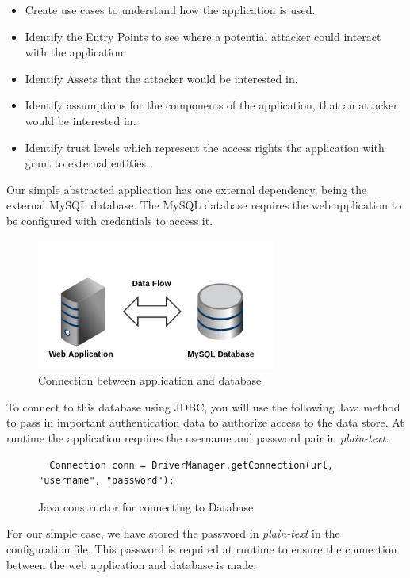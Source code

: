 \documentclass[11pt, a4paper, notitlepage]{article}
\begin{document}
\begin{itemize}
  \item Create use cases to understand how the application is used.
  \item Identify the Entry Points to see where a potential attacker could interact with the application.
  \item Identify Assets that the attacker would be interested in.
  \item Identify assumptions for the components of the application, that an attacker would be interested in.
  \item Identify trust levels which represent the access rights the application with grant to external entities. 
\end{itemize}

Our simple abstracted application has one external dependency, being the external MySQL database.  The MySQL database requires the web application to be configured with credentials to access it. 

\begin{figure}[h!]
    \centering
    \includegraphics[width=0.7\textwidth]{external-overview.jpg}
    \caption{Connection between application and database}
\end{figure}

To connect to this database using JDBC, you will use the following Java method to pass in important authentication data to authorize access to the data store. At runtime the application requires the username and password pair in \emph{plain-text}. 


\begin{figure}[h!]
\begin{lstlisting}
  Connection conn = DriverManager.getConnection(url, "username", "password");
\end{lstlisting} 
\caption{Java constructor for connecting to Database}
\end{figure}

For our simple case, we have stored the password in \emph{plain-text} in the configuration file. This password is required at runtime to ensure the connection between the web application and database is made. 
\end{document}
